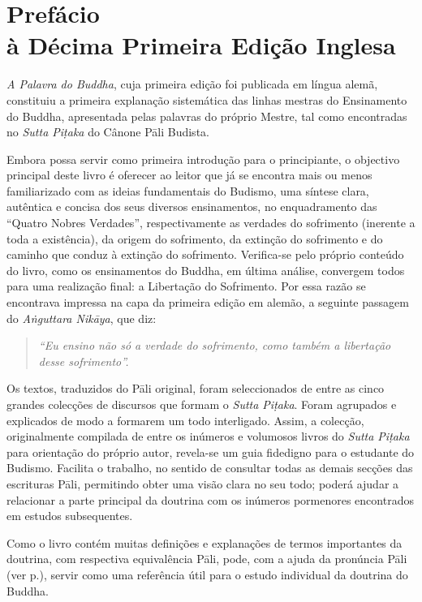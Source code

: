 \chapter[Prefácio à Décima Primeira Edição Inglesa]{Prefácio\\ à Décima Primeira Edição Inglesa}

\emph{A Palavra do Buddha}, cuja primeira edição foi publicada em língua alemã,
constituiu a primeira explanação sistemática das linhas mestras do Ensinamento
do Buddha, apresentada pelas palavras do próprio Mestre, tal como encontradas no
\emph{Sutta Piṭaka} do Cânone Pāli Budista.

Embora possa servir como primeira introdução para o principiante, o objectivo
principal deste livro é oferecer ao leitor que já se encontra mais ou menos
familiarizado com as ideias fundamentais do Budismo, uma síntese clara,
autêntica e concisa dos seus diversos ensinamentos, no enquadramento das
``Quatro Nobres Verdades'', respectivamente as verdades do sofrimento (inerente
a toda a existência), da origem do sofrimento, da extinção do sofrimento e do
caminho que conduz à extinção do sofrimento. Verifica-se pelo próprio conteúdo
do livro, como os ensinamentos do Buddha, em última análise, convergem todos
para uma realização final: a Libertação do Sofrimento. Por essa razão se
encontrava impressa na capa da primeira edição em alemão, a seguinte passagem do
\emph{Aṅguttara Nikāya}, que diz:

\begin{verse}
  \emph{``Eu ensino não só a verdade do sofrimento, como também a libertação
    desse sofrimento''.}
\end{verse}

Os textos, traduzidos do Pāli original, foram seleccionados de entre as cinco
grandes colecções de discursos que formam o \emph{Sutta Piṭaka}. Foram agrupados
e explicados de modo a formarem um todo interligado. Assim, a colecção,
originalmente compilada de entre os inúmeros e volumosos livros do \emph{Sutta
  Piṭaka} para orientação do próprio autor, revela-se um guia fidedigno para o
estudante do Budismo. Facilita o trabalho, no sentido de consultar todas as
demais secções das escrituras Pāli, permitindo obter uma visão clara no seu
todo; poderá ajudar a relacionar a parte principal da doutrina com os inúmeros
pormenores encontrados em estudos subsequentes.

Como o livro contém muitas definições e explanações de termos importantes da
doutrina, com respectiva equivalência Pāli, pode, com a ajuda da pronúncia Pāli
(ver p.\pageref{pron-pali}), servir como uma referência útil para o estudo individual
da doutrina do Buddha.

